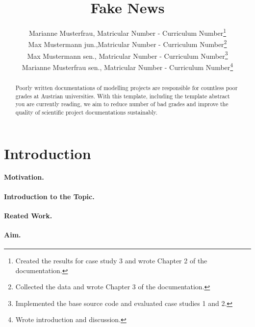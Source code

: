 \documentclass[a4paper,11pt]{scrartcl}
\begin{document}
\subject{LVA-Modeling and Simulation}
\title{Fake News}

\publishers{Supervisor: Max Mustermann}
\author{Marianne Musterfrau, Matricular Number - Curriculum Number\footnote{Created the results for case study 3 and wrote Chapter 2 of the documentation.}\\
Max Mustermann jun.,Matricular Number - Curriculum Number\footnote{Collected the data and wrote Chapter 3 of the documentation.}\\
Max Mustermann sen., Matricular Number - Curriculum Number\footnote{Implemented the base source code and evaluated case studies 1 and 2.}\\
Marianne Musterfrau sen., Matricular Number - Curriculum Number\footnote{Wrote introduction and discussion.}}

\maketitle

\begin{abstract}
Poorly written documentations of modelling projects are responsible for countless poor grades at Austrian universities. With this template, including the template abstract you are currently reading, we aim to reduce number of bad grades and improve the quality of scientific project documentations sustainably.
\end{abstract}

\newpage

\tableofcontents

\newpage

\section{Introduction}
\paragraph{Motivation.} 
\paragraph{Introduction to the Topic.} 
\paragraph{Reated Work.}
\paragraph{Aim.} 
\end{document}
